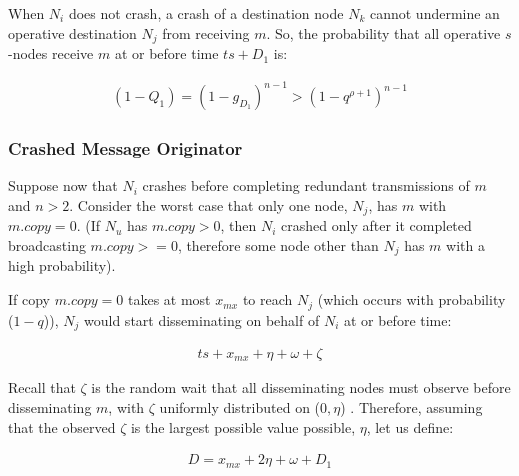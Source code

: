 When $N_i$ does not crash, a crash of a destination node $N_{k}$ cannot undermine an operative destination $N_{j}$ from receiving $m$. So, the probability that all operative $s$-nodes receive $m$ at or before time $ts +D_1$ is:

        \begin{equation*}
		    \begin{aligned}
		        (1-Q_1)=(1-g_{D_1})^{n-1}>(1-q^{\rho+1})^{n-1}
		    \end{aligned}
		\end{equation*}


        \clearpage
        \subsubsection*{Crashed Message Originator}
Suppose now that $N_i$ crashes before completing redundant transmissions of $m$ and $n>2$. Consider the worst case that only one node, $N_j$, has $m$ with $m.copy=0$. (If $N_u$ has $m.copy>0$, then $N_i$ crashed only after it completed broadcasting $m.copy >= 0$, therefore some node other than $N_j$ has $m$ with a high probability).

If copy $m.copy = 0$ takes at most $x_{mx}$ to reach $N_j$ (which occurs with probability ($1-q$)), $N_j$ would start disseminating on behalf of $N_i$ at or before time:
        
        \begin{equation*}
		    \begin{aligned}
		        ts+ x_{mx} + \eta + \omega +\zeta
		    \end{aligned}
		\end{equation*}
		
Recall that $\zeta$ is the random wait that all disseminating nodes must observe before disseminating $m$, with $\zeta$ uniformly distributed on ($0, \eta$) .  Therefore, assuming that the observed $\zeta$ is the largest possible value possible, $\eta$, let us define: 

        \begin{equation*}
		    \begin{aligned}
		        D = x_{mx} + 2\eta + \omega + D_1
		    \end{aligned}
		\end{equation*}
		
